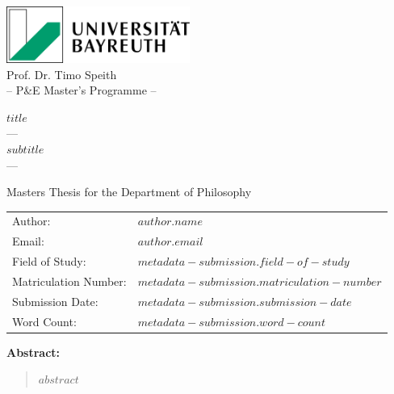 \begin{titlepage}
  \begin{center}
    \includegraphics[width=6cm]{latex/uni-bayreuth-logo.png}\\[1cm]
    {\Large Prof. Dr. Timo Speith}\\[0.5cm]
    {\large -- P\&E Master's Programme --}\\[2cm]
  \end{center}

  \begin{center}
    \LARGE\textbf{$title$}\\[1cm]
    {\large --- \\[0.5cm] $subtitle$ \\[0.5cm] ---}\\[2cm]
  \end{center}
  
  \begin{center}
    \large Masters Thesis for the Department of Philosophy
  \end{center}
  
  \begin{center}
    \begin{tabular}{ll}
      \toprule
      Author: & $author.name$ \\
      Email: & $author.email$ \\
      Field of Study: & $metadata-submission.field-of-study$ \\
      Matriculation Number: & $metadata-submission.matriculation-number$ \\
      Submission Date: & $metadata-submission.submission-date$ \\
      Word Count: & $metadata-submission.word-count$ \\
      \bottomrule
    \end{tabular}
  \end{center}
  
  \begin{center}
    \large\textbf{Abstract:}
  \end{center}
  
  \begin{quotation}
    $abstract$
  \end{quotation}
\end{titlepage}